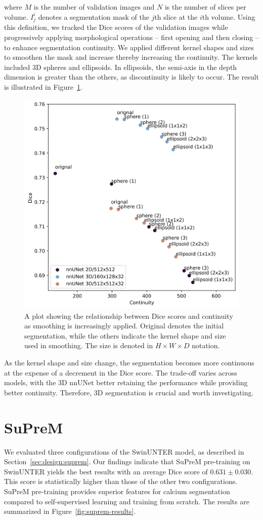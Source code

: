 \documentclass[a4paper,11pt,oneside]{report}
\begin{document}
where $M$ is the number of validation images and $N$ is the number of slices per volume. $I_{j}^{i}$ denotes a segmentation mask of the $j$th slice at the $i$th volume. Using this definition, we tracked the Dice scores of the validation images while progressively applying morphological operations -- first opening and then closing -- to enhance segmentation continuity. We applied different kernel shapes and sizes to smoothen the mask and increase thereby increasing the continuity. The kernels included 3D spheres and ellipsoids. In ellipsoids, the semi-axis in the depth dimension is greater than the others, as discontinuity is likely to occur. The result is illustrated in Figure~\ref{fig:nnunet-continuity-vs-correctness}.

\begin{figure}[htb]
    \centering
    \includegraphics[width=0.5\linewidth]{figures/result_nnunet_dice_and_continuity.png}
    \caption{A plot showing the relationship between Dice scores and continuity as smoothing is increasingly applied. Original denotes the initial segmentation, while the others indicate the kernel shape and size used in smoothing. The size is denoted in $H\times W\times D$ notation.}
    \label{fig:nnunet-continuity-vs-correctness}
\end{figure}

As the kernel shape and size change, the segmentation becomes more continuous at the expense of a decrement in the Dice score. The trade-off varies across models, with the 3D nnUNet better retaining the performance while providing better continuity. Therefore, 3D segmentation is crucial and worth investigating.

\section{SuPreM}
We evaluated three configurations of the SwinUNTER model, as described in Section~\ref{sec:design:suprem}. Our findings indicate that SuPreM pre-training on SwinUNTER yields the best results with an average Dice score of $0.631\pm0.030$. This score is statistically higher than those of the other two configurations. SuPreM pre-training provides superior features for calcium segmentation compared to self-supervised learning and training from scratch. The results are summarized in Figure~\ref{fig:suprem-results}.
\end{document}
